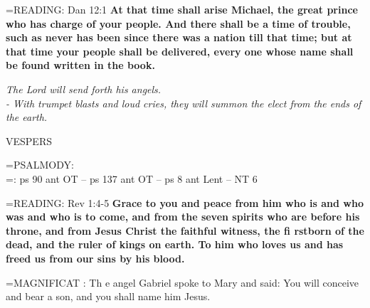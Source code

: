 \hangindent=\parindent \small{READING}: Dan 12:1 \textbf{At that time shall arise Michael, the great prince
who has charge of your people. And there shall be a time of trouble,
such as never has been since there was a nation till that time; but at that time your people shall be delivered, every one whose name
shall be found written in the book.}
 
\begin{center}
\textit{The Lord will send forth his angels.\\
- With trumpet blasts and loud cries, they will summon the elect from the ends of the earth.}
\end{center}


\begin{flushleft}\normalsize VESPERS\\\end{flushleft}

\hangindent=\parindent \small{PSALMODY:}\\
\hangindent=\parindent : ps 90 ant OT -- ps 137 ant OT -- ps 8 ant Lent -- NT 6\vspace{0.5em}

\hangindent=\parindent \small{READING}: Rev 1:4-5 \textbf{Grace to you and peace from him who is and who
was and who is to come, and from the seven spirits who are before
his throne, and from Jesus Christ the faithful witness, the fi rstborn
of the dead, and the ruler of kings on earth. To him who loves
us and has freed us from our sins by his blood.\\}
 
\hangindent=\parindent \small{MAGNIFICAT : Th e angel Gabriel spoke to Mary and said: You will
conceive and bear a son, and you shall name him Jesus.\\}
 

